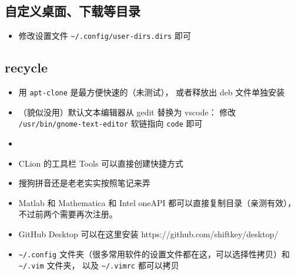 \subsection{自定义桌面、下载等目录}
\begin{itemize}
\item 修改设置文件 \verb|~/.config/user-dirs.dirs| 即可
\end{itemize}


\subsection{recycle}
\begin{itemize}
\item 用 \verb`apt-clone` 是最方便快速的（未测试）， 或者释放出 deb 文件单独安装
\item （貌似没用）默认文本编辑器从 gedit 替换为 vscode： 修改 \verb`/usr/bin/gnome-text-editor` 软链指向 \verb`code` 即可
\item 
\item CLion 的工具栏 Tools 可以直接创建快捷方式
\item 搜狗拼音还是老老实实按照笔记来弄
\item Matlab 和 Mathematica 和 Intel oneAPI 都可以直接复制目录（亲测有效）， 不过前两个需要再次注册。
\item GitHub Desktop 可以在这里安装 https://github.com/shiftkey/desktop/
\item \verb`~/.config` 文件夹（很多常用软件的设置文件都在这，可以选择性拷贝）和 \verb`~/.vim` 文件夹， 以及 \verb`~/.vimrc` 都可以拷贝
\end{itemize}
